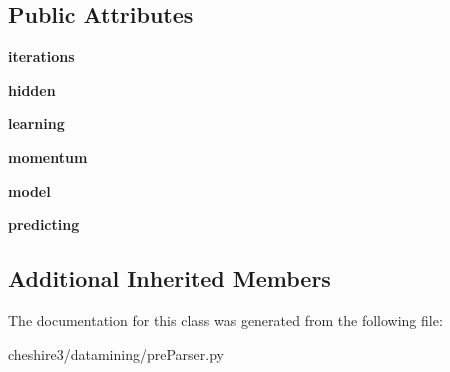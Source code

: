 \subsection*{Public Attributes}
\begin{DoxyCompactItemize}
\item 
\hypertarget{classcheshire3_1_1datamining_1_1pre_parser_1_1_bpnn_pre_parser_a8d6ff465df4befcb86ff2fcc4f063ce0}{{\bfseries iterations}}\label{classcheshire3_1_1datamining_1_1pre_parser_1_1_bpnn_pre_parser_a8d6ff465df4befcb86ff2fcc4f063ce0}

\item 
\hypertarget{classcheshire3_1_1datamining_1_1pre_parser_1_1_bpnn_pre_parser_a991ef26eb621be8f0c2babc7e7600701}{{\bfseries hidden}}\label{classcheshire3_1_1datamining_1_1pre_parser_1_1_bpnn_pre_parser_a991ef26eb621be8f0c2babc7e7600701}

\item 
\hypertarget{classcheshire3_1_1datamining_1_1pre_parser_1_1_bpnn_pre_parser_a25ef86dd7cf6c7bccb7b35add9a81ab8}{{\bfseries learning}}\label{classcheshire3_1_1datamining_1_1pre_parser_1_1_bpnn_pre_parser_a25ef86dd7cf6c7bccb7b35add9a81ab8}

\item 
\hypertarget{classcheshire3_1_1datamining_1_1pre_parser_1_1_bpnn_pre_parser_ab282e9b88c0289d9b002a728ab4db6fd}{{\bfseries momentum}}\label{classcheshire3_1_1datamining_1_1pre_parser_1_1_bpnn_pre_parser_ab282e9b88c0289d9b002a728ab4db6fd}

\item 
\hypertarget{classcheshire3_1_1datamining_1_1pre_parser_1_1_bpnn_pre_parser_a4663efc3e9f8f34f385d9700a0936ff3}{{\bfseries model}}\label{classcheshire3_1_1datamining_1_1pre_parser_1_1_bpnn_pre_parser_a4663efc3e9f8f34f385d9700a0936ff3}

\item 
\hypertarget{classcheshire3_1_1datamining_1_1pre_parser_1_1_bpnn_pre_parser_a5c0da54136c3eb16f610c0f1cc5adb09}{{\bfseries predicting}}\label{classcheshire3_1_1datamining_1_1pre_parser_1_1_bpnn_pre_parser_a5c0da54136c3eb16f610c0f1cc5adb09}

\end{DoxyCompactItemize}
\subsection*{Additional Inherited Members}


The documentation for this class was generated from the following file\-:\begin{DoxyCompactItemize}
\item 
cheshire3/datamining/pre\-Parser.\-py\end{DoxyCompactItemize}
